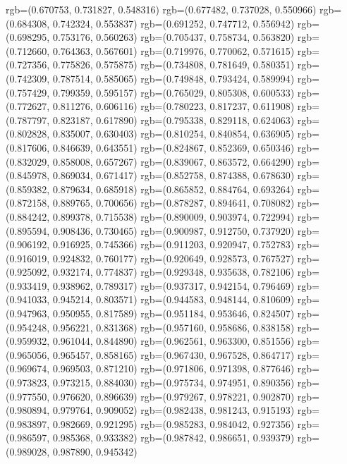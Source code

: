 {{{					rgb=(0.670753, 0.731827, 0.548316)
					rgb=(0.677482, 0.737028, 0.550966)
					rgb=(0.684308, 0.742324, 0.553837)
					rgb=(0.691252, 0.747712, 0.556942)
					rgb=(0.698295, 0.753176, 0.560263)
					rgb=(0.705437, 0.758734, 0.563820)
					rgb=(0.712660, 0.764363, 0.567601)
					rgb=(0.719976, 0.770062, 0.571615)
					rgb=(0.727356, 0.775826, 0.575875)
					rgb=(0.734808, 0.781649, 0.580351)
					rgb=(0.742309, 0.787514, 0.585065)
					rgb=(0.749848, 0.793424, 0.589994)
					rgb=(0.757429, 0.799359, 0.595157)
					rgb=(0.765029, 0.805308, 0.600533)
					rgb=(0.772627, 0.811276, 0.606116)
					rgb=(0.780223, 0.817237, 0.611908)
					rgb=(0.787797, 0.823187, 0.617890)
					rgb=(0.795338, 0.829118, 0.624063)
					rgb=(0.802828, 0.835007, 0.630403)
					rgb=(0.810254, 0.840854, 0.636905)
					rgb=(0.817606, 0.846639, 0.643551)
					rgb=(0.824867, 0.852369, 0.650346)
					rgb=(0.832029, 0.858008, 0.657267)
					rgb=(0.839067, 0.863572, 0.664290)
					rgb=(0.845978, 0.869034, 0.671417)
					rgb=(0.852758, 0.874388, 0.678630)
					rgb=(0.859382, 0.879634, 0.685918)
					rgb=(0.865852, 0.884764, 0.693264)
					rgb=(0.872158, 0.889765, 0.700656)
					rgb=(0.878287, 0.894641, 0.708082)
					rgb=(0.884242, 0.899378, 0.715538)
					rgb=(0.890009, 0.903974, 0.722994)
					rgb=(0.895594, 0.908436, 0.730465)
					rgb=(0.900987, 0.912750, 0.737920)
					rgb=(0.906192, 0.916925, 0.745366)
					rgb=(0.911203, 0.920947, 0.752783)
					rgb=(0.916019, 0.924832, 0.760177)
					rgb=(0.920649, 0.928573, 0.767527)
					rgb=(0.925092, 0.932174, 0.774837)
					rgb=(0.929348, 0.935638, 0.782106)
					rgb=(0.933419, 0.938962, 0.789317)
					rgb=(0.937317, 0.942154, 0.796469)
					rgb=(0.941033, 0.945214, 0.803571)
					rgb=(0.944583, 0.948144, 0.810609)
					rgb=(0.947963, 0.950955, 0.817589)
					rgb=(0.951184, 0.953646, 0.824507)
					rgb=(0.954248, 0.956221, 0.831368)
					rgb=(0.957160, 0.958686, 0.838158)
					rgb=(0.959932, 0.961044, 0.844890)
					rgb=(0.962561, 0.963300, 0.851556)
					rgb=(0.965056, 0.965457, 0.858165)
					rgb=(0.967430, 0.967528, 0.864717)
					rgb=(0.969674, 0.969503, 0.871210)
					rgb=(0.971806, 0.971398, 0.877646)
					rgb=(0.973823, 0.973215, 0.884030)
					rgb=(0.975734, 0.974951, 0.890356)
					rgb=(0.977550, 0.976620, 0.896639)
					rgb=(0.979267, 0.978221, 0.902870)
					rgb=(0.980894, 0.979764, 0.909052)
					rgb=(0.982438, 0.981243, 0.915193)
					rgb=(0.983897, 0.982669, 0.921295)
					rgb=(0.985283, 0.984042, 0.927356)
					rgb=(0.986597, 0.985368, 0.933382)
					rgb=(0.987842, 0.986651, 0.939379)
					rgb=(0.989028, 0.987890, 0.945342)
}}}

